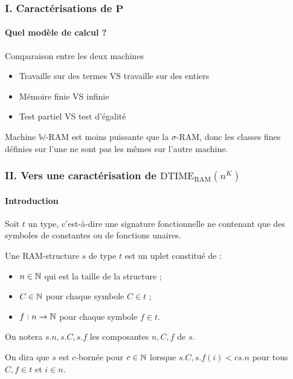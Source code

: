 \documentclass[10pt]{beamer}
\newcommand{\bbW}{\mathbb{W}}
\newcommand{\dtimeram}{\text{DTIME}_{\text{RAM}}\left( n^K \right)}
\begin{document}
	
	\begin{frame}
		\frametitle{I. Caractérisations de $\textbf{P}$}
		\framesubtitle{Quel modèle de calcul ?}
		
		\begin{block}{Comparaison entre les deux machines}
			\begin{itemize}
				\item 	Travaille sur des termes VS travaille sur des entiers
				\item 	Mémoire finie VS infinie
				\item 	Test partiel VS test d'égalité
			\end{itemize}
			
			
			Machine $\bbW$-RAM est moins puissante que la $\sigma$-RAM, donc les classes fines définies sur l'une ne sont pas les mêmes sur l'autre machine.
			
		\end{block}
	\end{frame}
	
	
	
	
	\begin{frame}
		\frametitle{II. Vers une caractérisation de $\dtimeram$}
		\framesubtitle{Introduction}
		
		\begin{defn}
			Soit $t$ un type, c'est-à-dire une signature fonctionnelle ne contenant que des symboles de constantes ou de fonctions unaires.
			
			Une RAM-structure $s$ de type $t$ est un uplet constitué de :
			\begin{itemize}[itemsep=-1mm]
				\item 	$n \in \mathbb{N}$ qui est la taille de la structure ;
				\item 	$C \in \mathbb{N}$ pour chaque symbole $C \in t$ ;
				\item 	$f : n \to \mathbb{N}$ pour chaque symbole $f \in t$.
			\end{itemize}
			
			On notera $s.n, s.C, s.f$ les composantes $n, C, f$ de $s$.
			
			On dira que $s$ est $c$-bornée pour $c\in\mathbb{N}$ lorsque $s.C, s.f(i) < c s.n$ pour tous $C, f \in t$ et $i \in n$.
		\end{defn}
		
	\end{frame}
	
\end{document}
